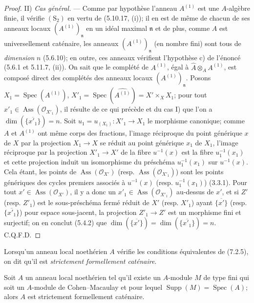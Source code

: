 \begin{proof}
\medskip\noindent
II) \emph{Cas général.} --- Comme par hypothèse l'anneau $A^{(1)}$ est une
$A$-algèbre finie, il vérifie $(\mathrm S_2)$ en vertu de (5.10.17, (i));
il en est de même de chacun de ses anneaux locaux
$(A^{(1)})_{\mathfrak n}$ en un idéal maximal $\mathfrak n$ et de plus,
comme $A$ est universellement caténaire, les anneaux
$(A^{(1)})_{\mathfrak n}$ (en nombre fini) sont tous de \emph{dimension}
$n$ (5.6.10); en outre, ces anneaux vérifient l'hypothèse c) de l'énoncé
(5.6.1 et 5.11.7, (ii)). On sait que le complété de $A^{(1)}$, égal à
$\widehat A\otimes_AA^{(1)}$, est composé direct des complétés des anneaux
locaux $(A^{(1)})_{\mathfrak n}$. Posons
$X_1=\operatorname{Spec}(A^{(1)})$,
$X'_1=\operatorname{Spec}(\widehat{A^{(1)}})=X'\times_XX_1$; pour tout
$x'_1\in\operatorname{Ass}(\mathscr O_{X'_1})$, il résulte de ce qui
précède et du cas I) que l'on a $\dim(\overline{\{x'_1\}})=n$. Soit
$u_1=u_{(X_1)}:X'_1\to X_1$ le morphisme canonique; comme $A$ et $A^{(1)}$
ont même corps des fractions, l'image réciproque du point générique $x$ de
$X$ par la projection $X_1\to X$ se réduit au point générique $x_1$ de
$X_1$, l'image réciproque par la projection $X'_1\to X'$ de la fibre
$u^{-1}(x)$ est la fibre $u_1^{-1}(x_1)$ et cette projection induit un
isomorphisme du préschéma $u_1^{-1}(x_1)$ sur $u^{-1}(x)$. Cela étant, les
points de $\operatorname{Ass}(\mathscr O_{X'})$ (resp.
$\operatorname{Ass}(\mathscr O_{X'_1})$) sont les points génériques des
cycles premiers associés à $u^{-1}(x)$ (resp. $u_1^{-1}(x_1)$) (3.3.1).
Pour tout $x'\in\operatorname{Ass}(\mathscr O_{X'})$, il y a donc un
$x'_1\in\operatorname{Ass}(\mathscr O_{X'_1})$ au-dessus de $x'$, et si
$Z'$ (resp. $Z'_1$) est le sous-préschéma fermé réduit de $X'$ (resp.
$X'_1$) ayant $\overline{\{x'\}}$ (resp. $\overline{\{x'_1\}}$) pour
espace sous-jacent, la projection $Z'_1\to Z'$ est un morphisme fini et
surjectif; on en conclut (5.4.2) que
$\dim(\overline{\{x'\}})=\dim(\overline{\{x'_1\}})=n$. C.Q.F.D.
\end{proof}

\begin{definition}[7.2.6]
\label{IV.2.s7.2.6-fr}
Lorsqu'un anneau local noethérien $A$ vérifie les conditions équivalentes de
(7.2.5), on dit qu'il est \emph{strictement formellement caténaire}.
\end{definition}


\begin{corollary}[7.2.7]
\label{IV.2.s7.2.7-fr}
Soit $A$ un anneau local noethérien tel qu'il existe un $A$-module $M$ de
type fini qui soit un $A$-module de Cohen--Macaulay et pour lequel
$\operatorname{Supp}(M)=\operatorname{Spec}(A)$; alors $A$ est strictement
formellement caténaire.
\end{corollary}

